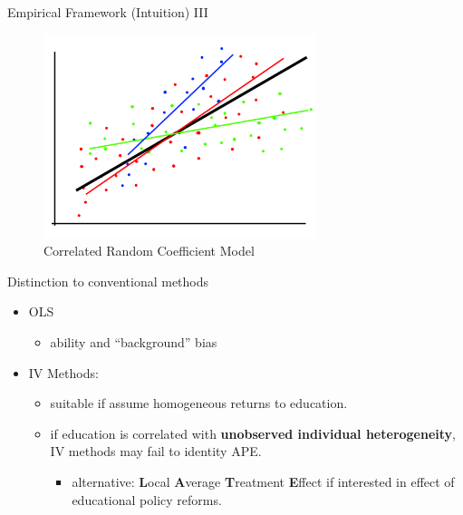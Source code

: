 \documentclass[10pt,ignorenonframetext,]{beamer}
\providecommand{\tightlist}{%
  \setlength{\itemsep}{0pt}\setlength{\parskip}{0pt}}
\begin{document}
\begin{frame}{Empirical Framework (Intuition) III}
\protect\hypertarget{empirical-framework-intuition-iii}{}

\begin{figure}
\centering
\includegraphics[width=3.125in,height=\textheight]{img/rcmodel003.png}
\caption{Correlated Random Coefficient Model}
\end{figure}

\end{frame}

\begin{frame}{Distinction to conventional methods}
\protect\hypertarget{distinction-to-conventional-methods}{}

\begin{itemize}
\tightlist
\item
  OLS

  \begin{itemize}
  \tightlist
  \item
    ability and ``background'' bias
  \end{itemize}
\item
  IV Methods:

  \begin{itemize}
  \tightlist
  \item
    suitable if assume homogeneous returns to education.
  \item
    if education is correlated with \textbf{unobserved individual
    heterogeneity}, IV methods may fail to identity APE.

    \begin{itemize}
    \tightlist
    \item
      alternative: \textbf{L}ocal \textbf{A}verage \textbf{T}reatment
      \textbf{E}ffect if interested in effect of educational policy
      reforms.
    \end{itemize}
  \end{itemize}
\end{itemize}

\end{frame}
\end{document}
